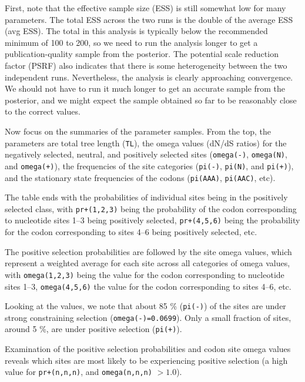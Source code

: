 \documentclass[12pt]{book}
\newcommand{\ttt}[1]{\texttt{#1}}
\begin{document}
First, note that the effective sample size (ESS) is still somewhat low for many parameters. The
total ESS across the two runs is the double of the average ESS (avg ESS). The total in this
analysis is typically below the recommended minimum of 100 to 200, so we need to run the analysis
longer to get a publication-quality sample from the posterior. The potential scale reduction factor
(PSRF) also indicates that there is some heterogeneity between the two independent runs.
Nevertheless, the analysis is clearly approaching convergence. We should not have to run it much
longer to get an accurate sample from the posterior, and we might expect the sample obtained so far
to be reasonably close to the correct values.

Now focus on the summaries of the parameter samples. From the top, the parameters are total tree
length (\ttt{TL}), the omega values (dN/dS ratios) for the negatively selected, neutral, and
positively selected sites (\ttt{omega(-)}, \ttt{omega(N)}, and \ttt{omega(+)}), the frequencies of
the site categories (\ttt{pi(-)}, \ttt{pi(N)}, and \ttt{pi(+)}), and the stationary state
frequencies of the codons (\ttt{pi(AAA)}, \ttt{pi(AAC)}, etc).

The table ends with the probabilities of individual sites being in the positively selected class,
with \ttt{pr+(1,2,3)} being the probability of the codon corresponding to nucleotide sites 1--3
being positively selected, \ttt{pr+(4,5,6)} being the probability for the codon corresponding to
sites 4--6 being positively selected, etc.

The positive selection probabilities are followed by the site omega values, which represent a
weighted average for each site across all categories of omega values, with \ttt{omega(1,2,3)} being
the value for the codon corresponding to nucleotide sites 1--3, \ttt{omega(4,5,6)} the value for
the codon corresponding to sites 4--6, etc.

Looking at the values, we note that about 85 \% (\ttt{pi(-)}) of the sites are under strong
constraining selection (\ttt{omega(-)=0.0699}). Only a small fraction of sites, around 5 \%, are
under positive selection (\ttt{pi(+)}).

Examination of the positive selection probabilities and codon site omega values reveals which sites
are most likely to be experiencing positive selection (a high value for \ttt{pr+(n,n,n)}, and
\ttt{omega(n,n,n)} $> 1.0$).
\end{document}
